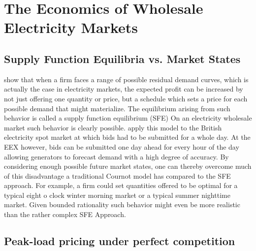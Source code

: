 \section{The Economics of Wholesale Electricity Markets}

\subsection{Supply Function Equilibria vs. Market States}

\cite{Klemperer1989} show that when a firm faces a range of possible residual demand curves, which is actually the case in electricity markets, the expected profit can be increased by not just offering one quantity or price, but a schedule which sets a price for each possible demand that might materialize. The equilibrium arising from such behavior is called a supply function equilibrium (SFE) On an electricity wholesale market such behavior is clearly possible. \cite{Green1992} apply this model to the British electricity spot market at which bids had to be submitted for a whole day. At the EEX however, bids can be submitted one day ahead for every hour of the day allowing generators to forecast demand with a high degree of accuracy. By considering enough possible future market states, one can thereby overcome much of this disadvantage a traditional Cournot model has compared to the SFE approach. For example, a firm could set quantities offered to be optimal for a typical eight o clock winter morning market or a typical summer nighttime market. Given bounded rationality such behavior might even be more realistic than the rather complex SFE Approach.

\subsection{Peak-load pricing under perfect competition}

